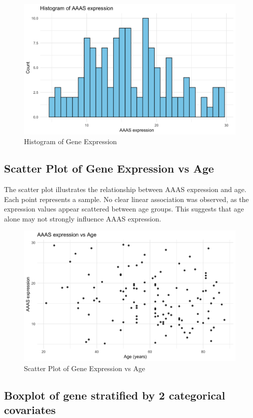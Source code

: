 \documentclass{article}
\begin{document}
\begin{figure}[H]
\centering
\includegraphics[width=0.80\linewidth]{Histogram of AAAS expression.png}
\caption{\label{fig:histogram}Histogram of Gene Expression}
\end{figure}

\subsection{Scatter Plot of Gene Expression vs Age}

The scatter plot illustrates the relationship between AAAS expression and age. Each point represents a sample. No clear linear association was observed, as the expression values appear scattered between age groups. This suggests that age alone may not strongly influence AAAS expression.

\begin{figure}[H]
\centering
\includegraphics[width=0.80\linewidth]{AAAS expression vs Age.png}
\caption{\label{fig:scatterplot}Scatter Plot of Gene Expression vs Age}
\end{figure}

\subsection{Boxplot of gene stratified by 2 categorical covariates}
\end{document}
